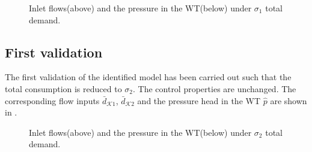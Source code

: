  \begin{figure}[H]
 \centering
  
 \vspace{-2.5mm}
 \end{figure}

 \vspace{-5mm}

 \begin{figure}[H]
 \centering
 \hspace{-4.5mm}
  
 \vspace{-2.5mm}
 \caption{Inlet flows(above) and the pressure in the WT(below) under $\sigma_1$ total demand.}
 \label{fig:identification_example1}
 \end{figure}

 \vspace{-3mm}


 \subsection{First validation}
 \label{validation_1}

 The first validation of the identified model has been carried out such that the total consumption is reduced to $\sigma_2$. The control properties are unchanged. The corresponding flow inputs $\bar{d}_{\mathcal{K}1}$, $\bar{d}_{\mathcal{K}2}$ and the pressure head in the WT $\hat{p}$ are shown in . 

 \vspace{-3mm}

 \begin{figure}[H]
 \centering
  
 \vspace{-2.5mm}
 \end{figure}

 \vspace{-5.5mm}

 \begin{figure}[H]
 \centering
 \hspace{-4.5mm}
  
 \vspace{-2.5mm}
 \caption{Inlet flows(above) and the pressure in the WT(below) under $\sigma_2$ total demand.}
 \label{fig:identification_example1_v1}
 \end{figure}

